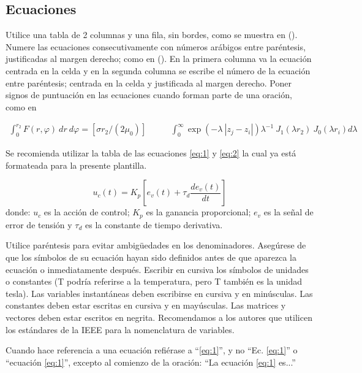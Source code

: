 \documentclass[a4paper, 12pt]{article}
\begin{document}
\subsection{Ecuaciones}

Utilice una tabla de 2 columnas y una fila, sin bordes, como se muestra en (). Numere las
ecuaciones consecutivamente con números arábigos entre paréntesis, justificadas al margen derecho;
como en (). En la primera columna va la ecuación centrada en la celda y en la segunda columna se
escribe el número de la ecuación entre paréntesis; centrada en la celda y justificada al margen derecho.
Poner signos de puntuación en las ecuaciones cuando forman parte de una oración, como en

\begin{equation} \label{eq:1}
    \begin{split}
            \int^{r_2}_0 F(r, \varphi)\ dr\ d\varphi = \left[\sigma r_2 / (2\mu_0)\right]
    \end{split}
    \qquad
    \begin{split}
        \int^\infty_0 \exp(-\lambda\ |z_j-z_i|)\lambda^{-1}\ J_1(\lambda r_2)\ J_0(\lambda r_i) d\lambda
    \end{split}
\end{equation}

Se recomienda utilizar la tabla de las ecuaciones \eqref{eq:1} y \eqref{eq:2} la cual ya está formateada para la presente plantilla.

\begin{equation} \label{eq:2}
    u_c(t) = K_p \left[e_v(t)+\tau_d\frac{de_v(t)}{dt}\right]
\end{equation}
donde: $u_c$ es la acción de control; $K_p$ es la ganancia proporcional; $e_v$ es la señal de error de tensión y $\tau_d$ es la constante de tiempo derivativa.

Utilice paréntesis para evitar ambigüedades en los denominadores. Asegúrese de que los símbolos
de su ecuación hayan sido definidos antes de que aparezca la ecuación o inmediatamente después.
Escribir en cursiva los símbolos de unidades o constantes (T podría referirse a la temperatura, pero T
también es la unidad tesla). Las variables instantáneas deben escribirse en cursiva y en minúsculas.
Las constantes deben estar escritas en cursiva y en mayúsculas. Las matrices y vectores deben estar
escritos en negrita. Recomendamos a los autores que utilicen los estándares de la IEEE para la
nomenclatura de variables.

Cuando hace referencia a una ecuación refiérase a “\eqref{eq:1}”, y no “Ec. \eqref{eq:1}” o “ecuación \eqref{eq:1}”, excepto
al comienzo de la oración: “La ecuación \eqref{eq:1} es...”
\end{document}
